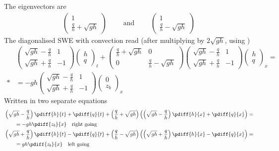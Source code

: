 The eigenvectors are
\begin{align}
    \begin{pmatrix} 1 \\ \frac{q}{h} + \sqrt{gh} \end{pmatrix}  \qquad \mbox{ and } \qquad
    \begin{pmatrix} 1 \\ \frac{q}{h} - \sqrt{gh} \end{pmatrix}
\end{align}
The diagonalised  SWE with convection read (after multiplying by $2\sqrt{gh}$, using  \maplesoft)
\begin{align}
    &\begin{pmatrix} \sqrt{gh} - \frac{q}{h} & 1  \\ \sqrt{gh} + \frac{q}{h} & -1 \end{pmatrix}
    \begin{pmatrix} h \\ q \end{pmatrix}_t +
    \begin{pmatrix} \frac{q}{h} + \sqrt{gh}   & 0  \\
        0 & \frac{q}{h} - \sqrt{gh}  \end{pmatrix}
    \begin{pmatrix} \sqrt{gh} - \frac{q}{h} & 1  \\ \sqrt{gh} + \frac{q}{h} & -1 \end{pmatrix}
    \begin{pmatrix} h \\ q \end{pmatrix}_x =
    \nonumber \\*
&= -gh \begin{pmatrix} \sqrt{gh} - \frac{q}{h} & 1  \\ \sqrt{gh} + \frac{q}{h} & -1 \end{pmatrix}
  \begin{pmatrix} 0  \\ z_b \end{pmatrix}_x
\end{align}
%
Written in two separate equations
\begin{align}
    &\left(\sqrt{gh} - \frac{q}{h}\right)\pdiff{h}{t} + \pdiff{q}{t} +  \left( \frac{q}{h} + \sqrt{gh}\right)\left( \left(\sqrt{gh} - \frac{q}{h} \right)\pdiff{h}{x} + \pdiff{q}{x} \right) =
    \nonumber \\*
    &\qquad = -gh\pdiff{z_b}{x} \quad \text{right going}
    \\
    &\left(\sqrt{gh} + \frac{q}{h}\right)\pdiff{h}{t} - \pdiff{q}{t} +  \left( \frac{q}{h} - \sqrt{gh}\right)\left( \left(\sqrt{gh} + \frac{q}{h} \right)\pdiff{h}{x} - \pdiff{q}{x} \right) =
    \nonumber \\*
    & \qquad = gh \pdiff{z_b}{x} \quad \text{left going}
\end{align}
